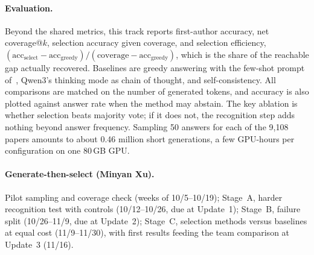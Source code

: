 \paragraph{Evaluation.}
Beyond the shared metrics, this track reports first-author accuracy, net coverage@$k$, selection accuracy given coverage, and selection efficiency, $(\mathrm{acc}_{\mathrm{select}}-\mathrm{acc}_{\mathrm{greedy}})/(\mathrm{coverage}-\mathrm{acc}_{\mathrm{greedy}})$, which is the share of the reachable gap actually recovered. Baselines are greedy answering with the few-shot prompt of~\cite{zhong2026dreaming}, Qwen3's thinking mode as chain of thought, and self-consistency. All comparisons are matched on the number of generated tokens, and accuracy is also plotted against answer rate when the method may abstain. The key ablation is whether selection beats majority vote; if it does not, the recognition step adds nothing beyond answer frequency. Sampling 50 answers for each of the 9,108 papers amounts to about 0.46 million short generations, a few GPU-hours per configuration on one 80\,GB GPU.


\paragraph{Generate-then-select (Minyan Xu).}
Pilot sampling and coverage check (weeks of 10/5--10/19); Stage~A, harder recognition test with controls (10/12--10/26, due at Update~1); Stage~B, failure split (10/26--11/9, due at Update~2); Stage~C, selection methods versus baselines at equal cost (11/9--11/30), with first results feeding the team comparison at Update~3 (11/16).

